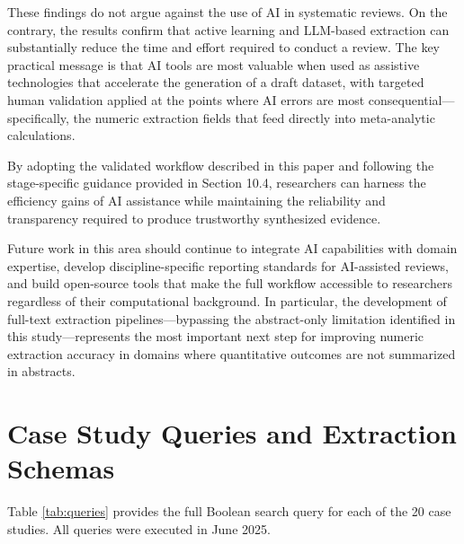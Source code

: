\documentclass[12pt]{article}
\begin{document}
These findings do not argue against the use of AI in systematic reviews. On the contrary, the results confirm that active learning and LLM-based extraction can substantially reduce the time and effort required to conduct a review. The key practical message is that AI tools are most valuable when used as assistive technologies that accelerate the generation of a draft dataset, with targeted human validation applied at the points where AI errors are most consequential---specifically, the numeric extraction fields that feed directly into meta-analytic calculations.

By adopting the validated workflow described in this paper and following the stage-specific guidance provided in Section 10.4, researchers can harness the efficiency gains of AI assistance while maintaining the reliability and transparency required to produce trustworthy synthesized evidence.

Future work in this area should continue to integrate AI capabilities with domain expertise, develop discipline-specific reporting standards for AI-assisted reviews, and build open-source tools that make the full workflow accessible to researchers regardless of their computational background. In particular, the development of full-text extraction pipelines---bypassing the abstract-only limitation identified in this study---represents the most important next step for improving numeric extraction accuracy in domains where quantitative outcomes are not summarized in abstracts.




\appendix

\section{Case Study Queries and Extraction Schemas}
\label{app:queries}

Table \ref{tab:queries} provides the full Boolean search query for each of the 20 case studies. All queries were executed in June 2025.
\end{document}
